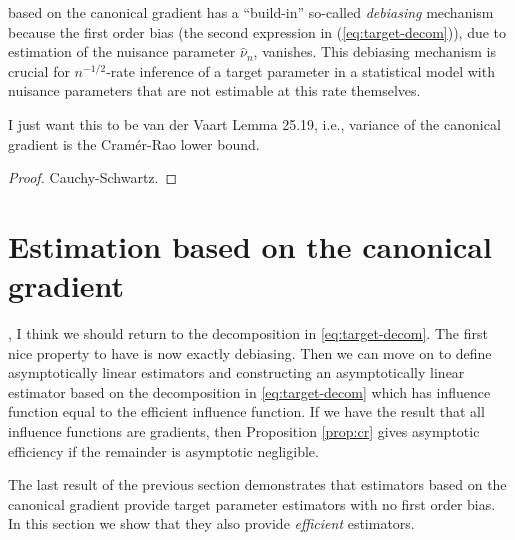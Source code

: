 \documentclass[a4,danish]{article}
\begin{document}
   based on the canonical gradient has a
``build-in'' so-called \textit{debiasing} mechanism because the first
order bias (the second expression in (\ref{eq:target-decom})), due to
estimation of the nuisance parameter $\hat{\nu}_n$, vanishes. This
debiasing mechanism is crucial for $n^{-1/2}$-rate inference of a
target parameter in a statistical model with nuisance parameters that
are not estimable at this rate themselves.  \\



\begin{proposition}
  I just want this to be van der Vaart Lemma 25.19, i.e., variance of
  the canonical gradient is the Cramér-Rao lower bound.
  \label{prop:cr}
\end{proposition}

\begin{proof}
  Cauchy-Schwartz.
\end{proof}
 

\section{Estimation based on the canonical gradient}
\label{sec:estim-based-canon}

, I think we should return
to the decomposition in \eqref{eq:target-decom}. The first nice
property to have is now exactly debiasing. Then we can move on to
define asymptotically linear estimators and constructing an
asymptotically linear estimator based on the decomposition in
\eqref{eq:target-decom} which has influence function equal to the
efficient influence function. If we have the result that all influence
functions are gradients, then Proposition \ref{prop:cr} gives
asymptotic efficiency if the remainder is asymptotic negligible.


 

The last result of the previous section demonstrates that estimators
based on the canonical gradient provide target parameter estimators
with no first order bias. In this section we show that they also
provide \textit{efficient} estimators.
\end{document}
